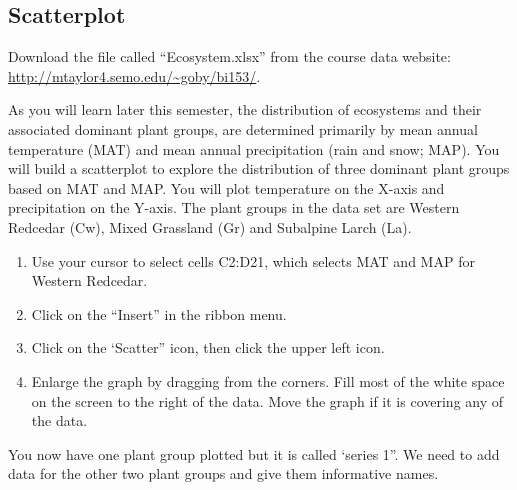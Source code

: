 \documentclass[11pt]{article}
\newcommand{\VSpace}{\vspace{\baselineskip}}
\begin{document}
\subsection*{Scatterplot}

Download the file called “Ecosystem.xlsx” from the course data website: \url{http://mtaylor4.semo.edu/~goby/bi153/}.\VSpace

As you will learn later this semester, the distribution of ecosystems and their associated dominant plant groups, are determined primarily by mean annual temperature (MAT) and mean annual precipitation (rain and snow; MAP). You will build a scatterplot to explore the distribution of three dominant plant groups based on MAT and MAP. You will plot temperature on the X-axis and precipitation on the Y-axis. The plant groups in the data set are Western Redcedar (Cw), Mixed Grassland (Gr) and Subalpine Larch (La). 

\begin{enumerate}
	\item Use your cursor to select cells C2:D21, which selects MAT and MAP for Western Redcedar.

	\item Click on the “Insert” in the ribbon menu.

	\item Click on the ‘Scatter” icon, then click the upper left icon.

	\item Enlarge the graph by dragging from the corners. Fill most of the white space on the screen to the right of the data. Move the graph if it is covering any of the data. 
\end{enumerate}

You now have one plant group plotted but it is called ‘series 1”. We need to add data for the other two plant groups and give them informative names. 
\end{document}
